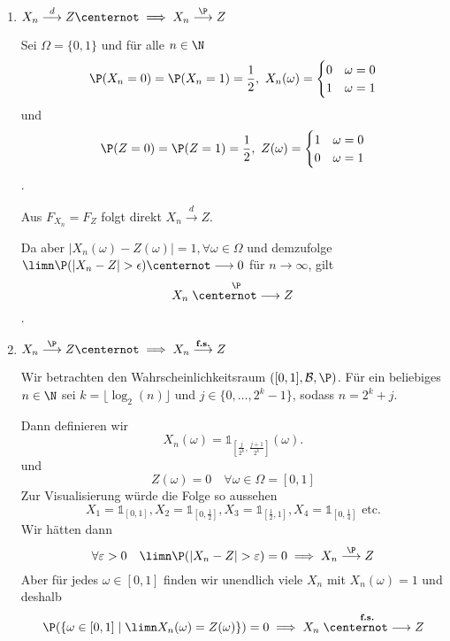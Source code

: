 \begin{enumerate}
    \item $X_n \overset{d}{\longrightarrow} Z \centernot\implies X_n \overset{\P}{\longrightarrow} Z$
    
    Sei $\Omega = \{0, 1\}$ und für alle $n \in \N$
    $$\P(X_n = 0) = \P(X_n = 1) = \frac{1}{2}, \ X_n(\omega) = \begin{cases}
        0 & \omega = 0\\
        1 & \omega = 1
    \end{cases} 
    $$
    und $$\P(Z = 0) = \P(Z = 1) = \frac{1}{2}, \ Z(\omega) = \begin{cases}
        1 & \omega = 0\\
        0 & \omega = 1
    \end{cases} $$. 

    Aus $F_{X_n} = F_Z$ folgt direkt $X_n \overset{d}{\longrightarrow} Z$.
    
    Da aber $|X_n(\omega) - Z(\omega)| = 1, \forall \omega \in \Omega$ und demzufolge\\ 
    $\limn \P(|X_n - Z| > \epsilon) \centernot\longrightarrow 0$ für $n \to \infty$, gilt  
    $$X_n \overset{\P}{\centernot\longrightarrow} Z$$.
    \item $X_n \overset{\P}{\longrightarrow} Z \centernot\implies X_n \overset{\textbf{f.s.}}{\longrightarrow} Z$
    
    Wir betrachten den Wahrscheinlichkeitsraum $([0,1], \mathcal{B}, \P)$.
    Für ein beliebiges $n \in \N$ sei $k = \lfloor\log_2(n)\rfloor$ und $j \in \{0, \ldots, 2^k-1\}$, sodass $n = 2^k + j$.
    
    Dann definieren wir 
    $$X_n(\omega) = \mathds{1}_{\left[\frac{j}{2^k}, \frac{j+1}{2^k}\right]}(\omega).$$
    und
    $$Z(\omega) = 0 \quad \forall \omega \in \Omega = [0,1]$$
    Zur Visualisierung würde die Folge so aussehen
    $$X_1 = \mathds{1}_{[0,1]}, X_2 = \mathds{1}_{\left[0,\frac{1}{2}\right]}, X_3 = \mathds{1}_{\left[\frac{1}{2}, 1\right]}, X_4 = \mathds{1}_{\left[0,\frac{1}{4}\right]} \text{ etc.}$$
    Wir hätten dann
    $$\forall \varepsilon > 0 \quad \limn \P(|X_n - Z| > \varepsilon) = 0 \implies X_n \overset{\P}{\longrightarrow} Z$$
    Aber für jedes $\omega \in [0,1]$ finden wir unendlich viele $X_n$ mit $X_n(\omega) = 1$ und deshalb
    $$\P(\{\omega \in [0,1] \mid \limn X_n(\omega) = Z(\omega)\}) = 0 \implies X_n \overset{\textbf{f.s.}}{\centernot\longrightarrow} Z$$
\end{enumerate}
